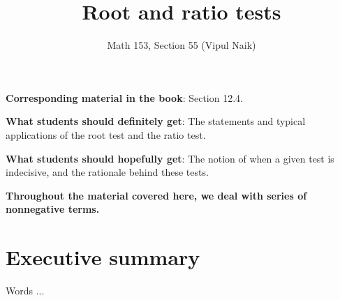 \documentclass[10pt]{amsart}
\title{Root and ratio tests}
\author{Math 153, Section 55 (Vipul Naik)}
\begin{document}
\maketitle

{\bf Corresponding material in the book}: Section 12.4.

{\bf What students should definitely get}: The statements and typical
applications of the root test and the ratio test.

{\bf What students should hopefully get}: The notion of when a given
test is indecisive, and the rationale behind these tests.

{\bf Throughout the material covered here, we deal with series of
nonnegative terms.}

\section*{Executive summary}

Words ...
\end{document}
